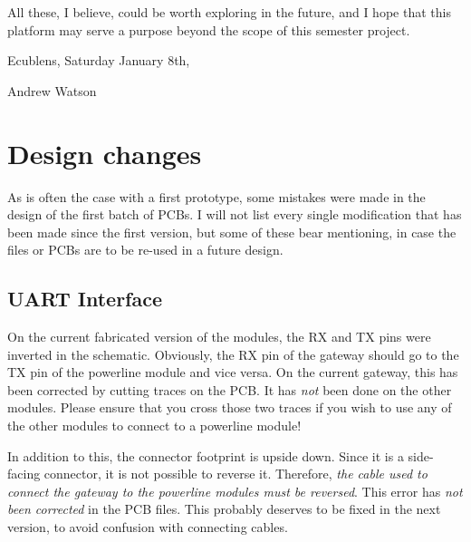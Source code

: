 All these, I believe, could be worth exploring in the future, and I hope that
this platform may serve a purpose beyond the scope of this semester project.

\vspace{3cm}
Ecublens, Saturday January 8th,

\vspace{2cm}
Andrew Watson



\pagebreak



\pagebreak
\appendix

\section{Design changes}
\label{sec:design-changes}

As is often the case with a first prototype, some mistakes were made in the
design of the first batch of PCBs. I will not list every single modification
that has been made since the first version, but some of these bear mentioning,
in case the files or PCBs are to be re-used in a future design.

\subsection{UART Interface}
On the current fabricated version of the modules, the RX and TX pins were
inverted in the schematic. Obviously, the RX pin of the gateway should go to the
TX pin of the powerline module and vice versa. On the current gateway, this has
been corrected by cutting traces on the PCB. It has \emph{not} been done on the
other modules. Please ensure that you cross those two traces if you wish to use
any of the other modules to connect to a powerline module!

In addition to this, the connector footprint is upside down. Since it is a
side-facing connector, it is not possible to reverse it. Therefore, \emph{the
cable used to connect the gateway to the powerline modules must be reversed}.
This error has \emph{not been corrected} in the PCB files. This probably
deserves to be fixed in the next version, to avoid confusion with connecting
cables.

